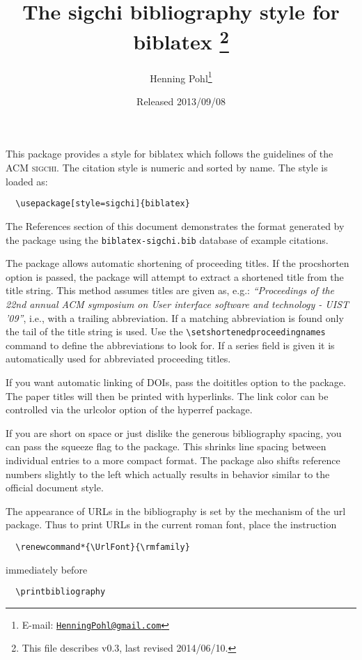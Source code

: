 \documentclass[a4paper]{ltxdoc}
\author{Henning Pohl\thanks{E-mail: 
  \href{mailto:HenningPohl@gmail.com}
  {\texttt{HenningPohl@gmail.com}}}}
\title{The \textsf{sigchi} bibliography style for \textsf{biblatex}%
  \footnote{This file describes v0.3, last revised 2014/06/10.}}
\date{Released 2013/09/08}
\begin{document}
\maketitle

This package provides a style for \textsf{biblatex} which follows the
guidelines of the \textsc{ACM sigchi}.
The citation style is numeric and sorted by name.
The style is loaded as:
\begin{verbatim}
  \usepackage[style=sigchi]{biblatex}
\end{verbatim}
The References section of this document demonstrates the format 
generated by the package using the \texttt{biblatex-sigchi.bib} database
of example citations.

The package allows automatic shortening of proceeding titles.
If the \textsf{procshorten} option is passed, the package will attempt to extract a shortened title from the title string.
This method assumes titles are given as, e.g.: \textit{``Proceedings of the 22nd annual ACM symposium on User interface software and technology - UIST '09''}, i.e., with a trailing abbreviation.
If a matching abbreviation is found only the tail of the title string is used.
Use the \verb|\setshortenedproceedingnames| command to define the abbreviations to look for.
If a \textsf{series} field is given it is automatically used for abbreviated proceeding titles.

If you want automatic linking of \textsf{DOIs}, pass the \textsf{doititles} option to the package.
The paper titles will then be printed with hyperlinks.
The link color can be controlled via the \textsf{urlcolor} option of the \textsf{hyperref} package.

If you are short on space or just dislike the generous bibliography spacing, you can pass the \textsf{squeeze} flag to the package.
This shrinks line spacing between individual entries to a more compact format.
The package also shifts reference numbers slightly to the left which actually results in behavior similar to the official document style.

The appearance of URLs in the bibliography is set by the mechanism of the
\textsf{url} package.
Thus to print URLs in the current roman font,
place the instruction
\begin{verbatim}
  \renewcommand*{\UrlFont}{\rmfamily}
\end{verbatim}
immediately before
\begin{verbatim}
  \printbibliography
\end{verbatim}
\end{document}
